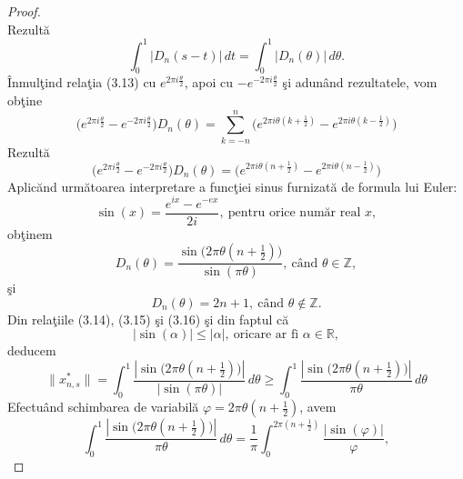 \documentclass[a4paper,openany,12pt]{report}
\begin{document}
\begin{proof}
\begin{equation*}
\end{equation*}
Rezult\u a 
\begin{equation*}
\int_0^1\left| D_n(s-t)\right|\, dt = \int_0^1\left| D_n(\theta)\right|\, d\theta.
\end{equation*}
\^ Inmul\c tind rela\c tia (3.13) cu $e^{2\pi i \frac{\theta}{2}}$, apoi cu $-e^{-2\pi i \frac{\theta}{2}}$ \c si adun\^ and rezultatele, vom ob\c tine
\begin{equation*}
\Big(e^{2\pi i \frac{\theta}{2}} - e^{-2\pi i \frac{\theta}{2}}\Big)D_n(\theta)=\sum_{k=-n}^{n}\Big(e^{2\pi i \theta (k+\frac{1}{2})}-e^{2\pi i \theta (k-\frac{1}{2})}\Big)
\end{equation*}
Rezult\u a
\begin{equation*}
\Big(e^{2\pi i \frac{\theta}{2}} - e^{-2\pi i \frac{\theta}{2}}\Big)D_n(\theta)=\Big(e^{2\pi i \theta (n+\frac{1}{2})}-e^{2\pi i \theta (n-\frac{1}{2})}\Big)
\end{equation*}
Aplic\u and urm\u atoarea interpretare a func\c tiei sinus furnizat\u a de formula lui Euler:
\begin{equation*}
\sin(x) = \frac{e^{ix}-e^{-ex}}{2i}, \: \text{pentru orice num\u ar real } x, 
\end{equation*}
ob\c tinem
\begin{equation}
D_n(\theta) = \frac{\sin\Big(2\pi\theta(n +\frac{1}{2})\Big)}{\sin(\pi\theta)},\: \text{c\^ and }\theta \in \mathbb{Z}, 
\end{equation}
\c si 
\begin{equation}
D_n(\theta) = 2n+1, \: \text{c\^ and }\theta \notin \mathbb{Z}.
\end{equation}
Din rela\c tiile (3.14), (3.15) \c si (3.16) \c si din faptul c\u a
\begin{equation*}
\left| \sin(\alpha) \right| \leq \left| \alpha\right|,\: \text{oricare ar fi } \alpha \in \mathbb{R},
\end{equation*}
deducem
\begin{equation*}
\|x_{n,s}^*\| = \int_0^1 \frac{\left|\sin\Big(2\pi\theta(n +\frac{1}{2})\Big)\right|}{\left|\sin(\pi\theta)\right|}\, d\theta \geq \int_0^1 \frac{\left|\sin\Big(2\pi\theta(n +\frac{1}{2})\Big)\right|}{\pi\theta}\, d\theta
\end{equation*}
Efectu\^ and schimbarea de variabil\u a $\varphi = 2\pi\theta (n+\frac{1}{2})$, avem
\begin{equation*}
\int_0^1 \frac{\left|\sin\Big(2\pi\theta(n +\frac{1}{2})\Big)\right|}{\pi\theta}\, d\theta = \frac{1}{\pi} \int_0^{2\pi(n+\frac{1}{2})}\frac{\left| \sin(\varphi)\right|}{\varphi}, 

\end{equation*}
\end{proof}
\end{document}
